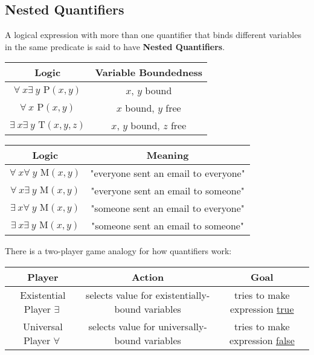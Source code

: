 \subsection{Nested Quantifiers}

A logical expression with more than one quantifier that binds different variables in the same predicate
is said to have \textbf{Nested Quantifiers}.

\begin{center}
  \begin{tabular}{c|c}
    Logic                                    & Variable Boundedness     \\
    \hline
    $\forall~ x \exists~ y \text{ P}(x, y)$    & $x$, $y$ bound           \\
    $\forall~ x \text{ P}(x, y)$              & $x$ bound, $y$ free      \\
    $\exists~ x \exists~ y \text{ T}(x, y, z)$ & $x$, $y$ bound, $z$ free \\
  \end{tabular}
  \quad
  \begin{tabular}{c|c}
    Logic                                 & Meaning                              \\
    \hline
    $\forall~ x \forall~ y \text{ M}(x, y)$ & "everyone sent an email to everyone" \\
    $\forall~ x \exists~ y \text{ M}(x, y)$ & "everyone sent an email to someone"  \\
    $\exists~ x \forall~ y \text{ M}(x, y)$ & "someone sent an email to everyone"  \\
    $\exists~ x \exists~ y \text{ M}(x, y)$ & "someone sent an email to someone"   \\
  \end{tabular}
\end{center}

\noindent There is a two-player game analogy for how quantifiers work:

\begin{center}
  \begin{tabular}{c|c|c}
    Player                       & Action                                          & Goal                                       \\
    \hline
    Existential Player $\exists~$ & selects value for existentially-bound variables & tries to make expression \underline{true}  \\
    Universal Player $\forall~$   & selects value for universally-bound variables   & tries to make expression \underline{false}
  \end{tabular}
\end{center}

